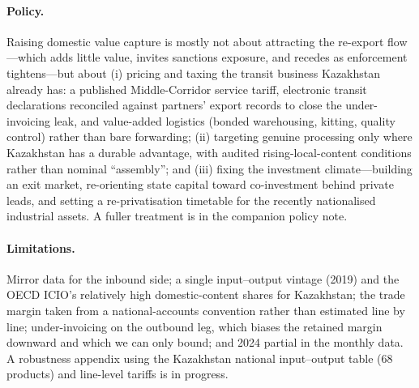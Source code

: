 \documentclass[12pt]{article}
\begin{document}
\paragraph{Policy.} Raising domestic value capture is mostly not about attracting the
re-export flow---which adds little value, invites sanctions exposure, and recedes as
enforcement tightens---but about (i) pricing and taxing the transit business Kazakhstan
already has: a published Middle-Corridor service tariff, electronic transit declarations
reconciled against partners' export records to close the under-invoicing leak, and
value-added logistics (bonded warehousing, kitting, quality control) rather than bare
forwarding; (ii) targeting genuine processing only where Kazakhstan has a durable advantage,
with audited rising-local-content conditions rather than nominal ``assembly''; and (iii)
fixing the investment climate---building an exit market, re-orienting state capital toward
co-investment behind private leads, and setting a re-privatisation timetable for the recently
nationalised industrial assets. A fuller treatment is in the companion policy note.

\paragraph{Limitations.} Mirror data for the inbound side; a single input--output vintage
(2019) and the OECD ICIO's relatively high domestic-content shares for Kazakhstan; the trade
margin taken from a national-accounts convention rather than estimated line by line;
under-invoicing on the outbound leg, which biases the retained margin downward and which we can
only bound; and 2024 partial in the monthly data. A robustness appendix using the Kazakhstan
national input--output table (68 products) and line-level tariffs is in progress.



\end{document}
